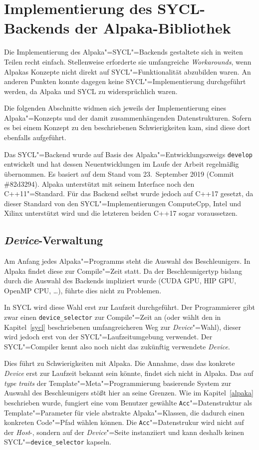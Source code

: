 \chapter{Implementierung des SYCL-Backends der Alpaka-Bibliothek}
\label{implementierung}

Die Implementierung des Alpaka"=SYCL"=Backends gestaltete sich in weiten Teilen
recht einfach. Stellenweise erforderte sie umfangreiche \textit{Workarounds},
wenn Alpakas Konzepte nicht direkt auf SYCL"=Funktionalität abzubilden waren.
An anderen Punkten konnte dagegen keine SYCL"=Implementierung durchgeführt
werden, da Alpaka und SYCL zu widersprüchlich waren.

Die folgenden Abschnitte widmen sich jeweils der Implementierung eines
Alpaka"=Konzepts und der damit zusammenhängenden Datenstrukturen. Sofern es bei
einem Konzept zu den beschriebenen Schwierigkeiten kam, sind diese dort
ebenfalls aufgeführt.

Das SYCL"=Backend wurde auf Basis des Alpaka"=Entwicklungszweigs
\texttt{develop} entwickelt und hat dessen Neuentwicklungen im Laufe der Arbeit
regelmäßig übernommen. Es basiert auf dem Stand vom 23.\ September 2019
(Commit \#82d3294). Alpaka unterstützt mit seinem Interface noch den
C++11"=Standard. Für das Backend selbst wurde jedoch auf C++17 gesetzt, da
dieser Standard von den SYCL"=Implementierungen ComputeCpp, Intel und Xilinx
unterstützt wird und die letzteren beiden C++17 sogar voraussetzen.

\section{\textit{Device}-Verwaltung}
\label{implementierung:device}

Am Anfang jedes Alpaka"=Programms steht die Auswahl des Beschleunigers. In
Alpaka findet diese zur Compile"=Zeit statt. Da der Beschleunigertyp bislang
durch die Auswahl des Backends impliziert wurde (CUDA \textrightarrow{} GPU,
HIP \textrightarrow{} GPU, OpenMP \textrightarrow{} CPU, \ldots), führte dies
nicht zu Problemen.

In SYCL wird diese Wahl erst zur Laufzeit durchgeführt. Der Programmierer gibt
zwar einen \texttt{device\_selector} zur Compile"=Zeit an (oder wählt den
in Kapitel~\ref{sycl} beschriebenen umfangreicheren Weg zur
\textit{Device}"=Wahl), dieser wird jedoch erst von der SYCL"=Laufzeitumgebung
verwendet. Der SYCL"=Compiler kennt also noch nicht das zukünftig verwendete
\textit{Device}.

Dies führt zu Schwierigkeiten mit Alpaka. Die Annahme, dass das konkrete
\textit{Device} erst zur Laufzeit bekannt sein könnte, findet sich nicht in
Alpaka. Das auf \textit{type traits} der Template"=Meta"=Programmierung
basierende System zur Auswahl des Beschleunigers stößt hier an seine Grenzen.
Wie im Kapitel~\ref{alpaka} beschrieben wurde, fungiert eine vom Benutzer
gewählte \texttt{Acc}"=Datenstruktur als Template"=Parameter für viele
abstrakte Alpaka"=Klassen, die dadurch einen konkreten Code"=Pfad wählen können.
Die \texttt{Acc}"=Datenstrukur wird nicht auf der \textit{Host}-, sondern auf
der \textit{Device}"=Seite instanziiert und kann deshalb keinen
SYCL"=\texttt{device\_selector} kapseln.

